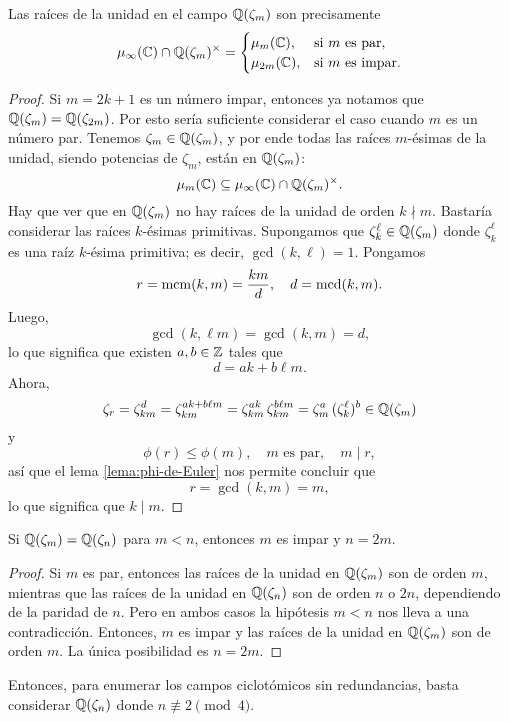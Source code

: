 \begin{proposicion}
  Las raíces de la unidad en el campo $\mathbb{Q} (\zeta_m)$ son precisamente
  \[ \mu_\infty (\mathbb{C}) \cap \mathbb{Q} (\zeta_m)^\times = \begin{cases}
    \mu_m (\mathbb{C}), & \text{si }m\text{ es par},\\
    \mu_{2m} (\mathbb{C}), & \text{si }m\text{ es impar}.
  \end{cases} \]

  \begin{proof}
    Si $m = 2k+1$ es un número impar, entonces ya notamos que
    $\mathbb{Q} (\zeta_m) = \mathbb{Q} (\zeta_{2m})$. Por esto sería suficiente considerar
    el caso cuando $m$ es un número par.  Tenemos $\zeta_m \in \mathbb{Q} (\zeta_m)$,
    y por ende todas las raíces $m$-ésimas de la unidad, siendo potencias de
    $\zeta_m$, están en $\mathbb{Q} (\zeta_m)$:
    $$\mu_m (\mathbb{C}) \subseteq \mu_\infty (\mathbb{C}) \cap \mathbb{Q} (\zeta_m)^\times.$$
    Hay que ver que en $\mathbb{Q} (\zeta_m)$ no hay raíces de la unidad de orden
    $k\nmid m$. Bastaría considerar las raíces $k$-ésimas primitivas.
    Supongamos que $\zeta_k^\ell \in \mathbb{Q} (\zeta_m)$ donde $\zeta_k^\ell$ es una
    raíz $k$-ésima primitiva; es decir, $\gcd (k,\ell) = 1$. Pongamos
    $$r = \operatorname{mcm} (k,m) = \frac{km}{d}, \quad d = \operatorname{mcd} (k,m).$$
    Luego,
    $$\gcd (k,\ell m) = \gcd (k,m) = d,$$
    lo que significa que existen $a,b \in \mathbb{Z}$ tales que
    $$d = a k + b\ell m.$$
    Ahora,
    \[ \zeta_r = \zeta_{km}^d
               = \zeta_{km}^{ak + b\ell m}
               = \zeta_{km}^{ak}\,\zeta_{km}^{b\ell m}
               = \zeta_m^a\,(\zeta_k^\ell)^b \in \mathbb{Q} (\zeta_m) \]
    y
    $$\phi (r) \le \phi (m), \quad m\text{ es par}, \quad m \mid r,$$
    así que el lema \ref{lema:phi-de-Euler} nos permite concluir que
    $$r = \gcd (k,m) = m,$$
    lo que significa que $k \mid m$.
  \end{proof}
\end{proposicion}

\begin{corolario}
  Si $\mathbb{Q} (\zeta_m) = \mathbb{Q} (\zeta_n)$ para $m < n$, entonces $m$ es impar y
  $n = 2m$.

  \begin{proof}
    Si $m$ es par, entonces las raíces de la unidad en $\mathbb{Q} (\zeta_m)$ son de
    orden $m$, mientras que las raíces de la unidad en $\mathbb{Q} (\zeta_n)$ son de
    orden $n$ o $2n$, dependiendo de la paridad de $n$. Pero en ambos casos la
    hipótesis $m < n$ nos lleva a una contradicción. Entonces, $m$ es impar
    y las raíces de la unidad en $\mathbb{Q} (\zeta_m)$ son de orden $m$. La única
    posibilidad es $n = 2m$.
  \end{proof}
\end{corolario}

Entonces, para enumerar los campos ciclotómicos sin redundancias, basta
considerar $\mathbb{Q} (\zeta_n)$ donde $n \not\equiv 2\pmod{4}$.
